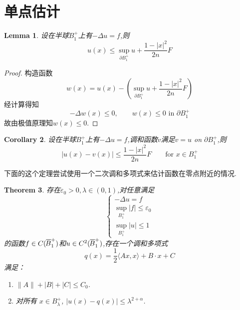 \documentclass[12pt,A4paper,reqno]{amsart}
\numberwithin{equation}{section}
\theoremstyle{plain}
\newtheorem{theorem}{Theorem}[section]
\newtheorem{lemma}[theorem]{Lemma}
\newtheorem{corollary}[theorem]{Corollary}
\theoremstyle{plain}
\theoremstyle{plain}
\numberwithin{equation}{section}
\theoremstyle{remark}
\newcommand*{\laeq}[0]{-\Delta u=f}
\newcommand*\widebar[1]{%
	\hbox{%
		\vbox{%
			\hrule height 0.5pt %
			\kern0.35ex%
			\hbox{%
				\kern -0.1em%
				\ensuremath{#1}%
				\kern 0em%
			}%
		}%
	}%
}
\begin{document}
\section{单点估计}
\begin{lemma}
	设在半球$B_1^{+}$上有$\laeq$,则
	$$u(x) \leqslant \sup _{\partial B_{1}^{+}} u+\frac{1-|x|^{2}}{2 n} F$$
\end{lemma}
\begin{proof}
	构造函数
	$$w(x)=u(x)-\left(\sup _{\partial B_{1}^{+}} u+\frac{1-|x|^{2}}{2 n} F\right)$$
	经计算得知
	$$ -\Delta w(x) \leqslant 0, \qquad  w(x)\leqslant 0 \text{ in } \partial B_1^{+}$$
	故由极值原理\cite[定理2.22]{周蜀林2005PDE}知$w(x) \leqslant 0.$
\end{proof}
\begin{corollary}
	设在半球$B_1^{+}$上有$\laeq$,调和函数$v$满足$v=u$ on $\partial B_1^+$,则
	$$|u(x)-v(x)| \leqslant \frac{1-|x|^2}{2n}F \qquad \text{for } x \in B_1^{+}$$
\end{corollary}
下面的这个定理尝试使用一个二次调和多项式来估计函数在零点附近的情况.
\begin{theorem}\label{thm:yidian}
	存在$\varepsilon_{0}>0, \lambda \in(0,1)$,对任意满足
	$$\begin{cases}
	\laeq\\
	\sup _{B_{1}^{+}} |f|\leqslant \varepsilon_{0}\\
	\sup _{B_{1}^{+}} |u|\leqslant 1
	\end{cases}$$
	的函数$f \in C(\widebar{B}_{1}^{+})$和$u \in C^{2}(\widebar{B}_{1}^{+})$,存在一个调和多项式
	$$q(x)=\frac{1}{2}\langle A x, x\rangle+ B \cdot x+C$$
	满足：
	\begin{enumerate}
		\item $\|A\|+|B|+|C| \leqslant C_{0}$.
		\item 对所有 $x \in B_{\lambda}^{+}$, $|u(x)-q(x)| \leqslant \lambda^{2+\alpha}$.
	\end{enumerate}
\end{theorem}
\end{document}
